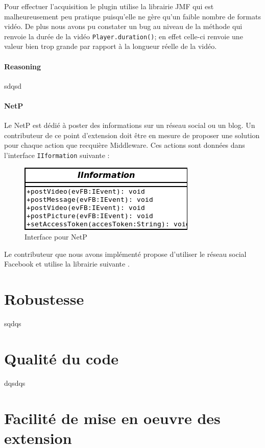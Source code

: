 Pour effectuer l'acquisition le plugin utilise la librairie JMF qui est malheureusement peu pratique puisqu'elle ne gère qu'un faible nombre de formats vidéo. De plus nous avons pu constater un bug au niveau de la méthode qui renvoie la durée de la vidéo \verb+Player.duration()+; en effet celle-ci renvoie une valeur bien trop grande par rapport à la longueur réelle de la vidéo.

\paragraph{Reasoning}
sdqsd
\paragraph{NetP}
Le  NetP est dédié à poster des informations sur un  réseau social ou un blog. Un contributeur de ce point d'extension doit être en mesure de proposer une solution pour chaque action que recquière Middleware. Ces actions sont données dans l'interface \verb+IIformation+ suivante :
\begin{figure}[!htbp]
  \centering
  \includegraphics[scale=0.50]{img/iinterface}
  \caption{Interface pour NetP}
  \label{fig:IInterface}
\end{figure}

Le contributeur que nous avons implémenté propose d'utiliser le réseau social Facebook et utilise la librairie suivante \cite{restFB}.


\section{Robustesse}
sqdqs
\section{Qualité du code}
dqsdqs
\section{Facilité de mise en oeuvre des extension}
